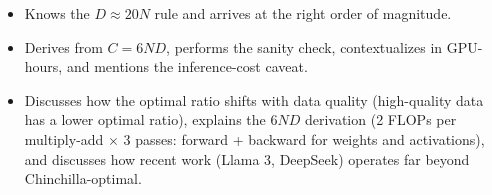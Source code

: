 \begin{interviewq}
\goodgreat
\begin{itemize}
    \item {} Knows the $D \approx 20N$ rule and arrives at the right order of magnitude.
    \item {} Derives from $C = 6ND$, performs the sanity check, contextualizes in GPU-hours, and mentions the inference-cost caveat.
    \item {} Discusses how the optimal ratio shifts with data quality (high-quality data has a lower optimal ratio), explains the $6ND$ derivation (2 FLOPs per multiply-add $\times$ 3 passes: forward + backward for weights and activations), and discusses how recent work (Llama 3, DeepSeek) operates far beyond Chinchilla-optimal.
\end{itemize}

\end{interviewq}

\medskip

